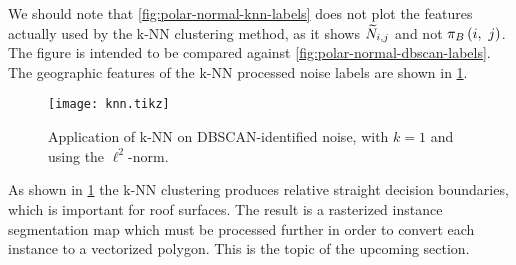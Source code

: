 We should note that \cref{fig:polar-normal-knn-labels} does not plot the features actually used by the k-NN clustering method, as it shows $\widetilde{N}_{i,j}$ and not $\pi_{B}\left(i,~j\right)$.
The figure is intended to be compared against \cref{fig:polar-normal-dbscan-labels}.
The geographic features of the k-NN processed noise labels are shown in \cref{fig:knn-tile}.
\begin{figure}[H]
  \centering
  \texttt{[image: knn.tikz]}
  \caption{Application of k-NN on DBSCAN-identified noise, with $k = 1$ and using the $\ell^2$-norm.}
  \label{fig:knn-tile}
\end{figure}
\noindent
As shown in \cref{fig:knn-tile} the k-NN clustering produces relative straight decision boundaries, which is important for roof surfaces.
The result is a rasterized instance segmentation map which must be processed further in order to convert each instance to a vectorized polygon.
This is the topic of the upcoming section.
\newpage
